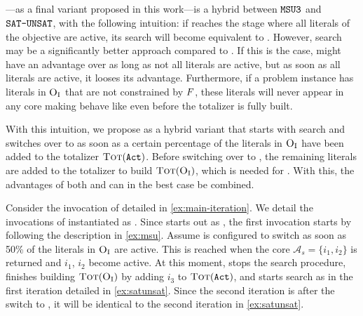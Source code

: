 \subsection{\msh{}\label{sec:hybrid}}

\msh{}---as a final variant proposed in this work---is a hybrid between $\texttt{MSU3}$ and $\texttt{SAT-UNSAT}$, with the following intuition:
if \msu{}  reaches the stage where all literals of the objective are active, its search will become equivalent to \unsatsat{}. %
However, \satunsat{} search may be a significantly better approach compared to \unsatsat{}.
If this is the case, \msu{} might have an advantage over \satunsat{} as long as not all literals are active, but as soon as all literals are active, it looses its advantage.
Furthermore, if a problem instance has literals in $\textsc{O}_{\text{I}}$ that are not constrained by $F$, these literals will never appear in any core making \msu{} behave like \unsatsat{} even before the totalizer is fully built.

With this intuition, we propose
\msh{} as a hybrid variant that starts with \msu{} search and switches over to \satunsat{} as soon as a certain percentage of the literals in $\textsc{O}_{\text{I}}$ have been added to the totalizer $\textsc{Tot}(\texttt{Act})$.
Before switching over to \satunsat{}, the remaining literals are added to the totalizer to build $\textsc{Tot}(\textsc{O}_{\text{I}})$, which is needed for \satunsat{}.
With this, the advantages of both \msu{} and \satunsat{} can in the best case be combined.

\begin{example}
Consider the invocation of \algname{} detailed in \cref{ex:main-iteration}.
We detail the invocations of \Min{} instantiated as \msh{}.
Since \msh{} starts out as \msu{}, the first invocation starts by following the description in \cref{ex:msu}.
Assume \msh{} is configured to switch as soon as 50\% of the literals in $\textsc{O}_{\text{I}}$ are active.
This is reached when the core $\mathcal{A}_s=\{i_1,i_2\}$ is returned and $i_1$, $i_2$ become active.
At this moment, \msh{} stops the \msu{} search procedure, finishes building $\textsc{Tot}(\textsc{O}_{\text{I}})$ by adding $i_3$ to $\textsc{Tot}(\texttt{Act})$, and starts \satunsat{} search as in the first iteration detailed in \cref{ex:satunsat}.
Since the second iteration is after the switch to \satunsat{}, it will be identical to the second iteration in \cref{ex:satunsat}.
\end{example}

